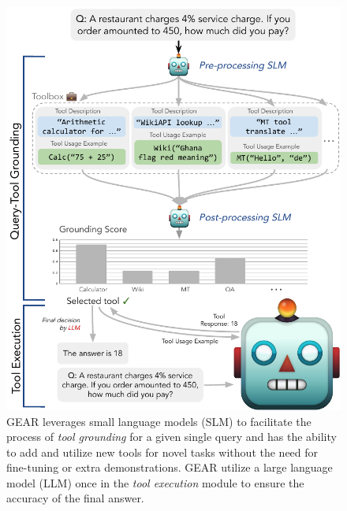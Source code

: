 \documentclass[11pt]{article}
\newcommand{\llm}{\textcolor{darkredTwo}{LLM}}
\newcommand{\slm}{\textcolor{darkblueTwo}{SLM}}
\newcommand{\name}{{\fontfamily{cmss}\selectfont GEAR}}
\begin{document}
\begin{figure}[ht]
    \centering
    \includegraphics[width=\linewidth,trim=0cm 0cm 0cm 1cm]{figures/Teaser_Figure.pdf}
    \caption{\name{} leverages small language models (\slm) to facilitate the process of \emph{tool grounding} for a given single query and has the ability to add and utilize new tools for novel tasks without the need for fine-tuning or extra demonstrations. \name{} utilize a large language model (\llm) once in the \emph{tool execution} module to ensure the accuracy of the final answer.}
    \label{Teaser_Figure}
\end{figure}
\end{document}
